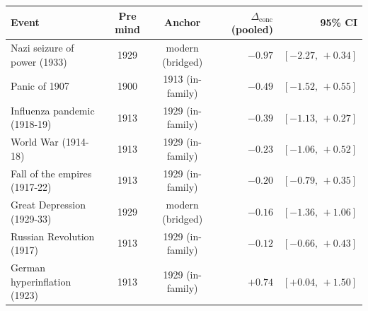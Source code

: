 \begin{tabular}{lccrr}
\toprule
Event & Pre mind & Anchor & $\Delta_{\text{conc}}$ (pooled) & 95\% CI \\
\midrule
Nazi seizure of power (1933) & 1929 & modern (bridged) & $-0.97$ & $[-2.27,\,+0.34]$ \\
Panic of 1907 & 1900 & 1913 (in-family) & $-0.49$ & $[-1.52,\,+0.55]$ \\
Influenza pandemic (1918-19) & 1913 & 1929 (in-family) & $-0.39$ & $[-1.13,\,+0.27]$ \\
World War (1914-18) & 1913 & 1929 (in-family) & $-0.23$ & $[-1.06,\,+0.52]$ \\
Fall of the empires (1917-22) & 1913 & 1929 (in-family) & $-0.20$ & $[-0.79,\,+0.35]$ \\
Great Depression (1929-33) & 1929 & modern (bridged) & $-0.16$ & $[-1.36,\,+1.06]$ \\
Russian Revolution (1917) & 1913 & 1929 (in-family) & $-0.12$ & $[-0.66,\,+0.43]$ \\
German hyperinflation (1923) & 1913 & 1929 (in-family) & $+0.74$ & $[+0.04,\,+1.50]$ \\
\bottomrule
\end{tabular}